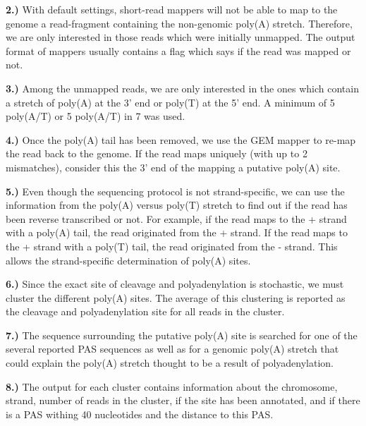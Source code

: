 \textbf{2.)} With default settings, short-read mappers will not be able to map
to the genome a read-fragment containing the non-genomic poly(A)
stretch. Therefore, we are only interested in those reads which were initially
unmapped. The output format of mappers usually contains a flag which says if
the read was mapped or not.

\textbf{3.)} Among the unmapped reads, we are only interested in the ones which
contain a stretch of poly(A) at the 3' end or poly(T) at the 5' end. A minimum
of 5 poly(A/T) or 5 poly(A/T) in 7 was used.

\textbf{4.)} Once the poly(A) tail has been removed, we use the GEM mapper to
re-map the read back to the genome. If the read maps uniquely (with up to 2
mismatches), consider this the 3' end of the mapping a putative poly(A) site.

\textbf{5.)} Even though the sequencing protocol is not strand-specific, we can
use the information from the poly(A) versus poly(T) stretch to find out if the
read has been reverse transcribed or not. For example, if the read maps to the
+ strand with a poly(A) tail, the read originated from the + strand. If the
read maps to the + strand with a poly(T) tail, the read originated from the -
strand. This allows the strand-specific determination of poly(A) sites.

\textbf{6.)} Since the exact site of cleavage and polyadenylation is stochastic,
we must cluster the different poly(A) sites. The average of this clustering is
reported as the cleavage and polyadenylation site for all reads in the cluster.

\textbf{7.)} The sequence surrounding the putative poly(A) site is searched for
one of the several reported PAS sequences as well as for a genomic poly(A)
stretch that could explain the poly(A) stretch thought to be a result of
polyadenylation.

\textbf{8.)} The output for each cluster contains information about the
chromosome, strand, number of reads in the cluster, if the site has been
annotated, and if there is a PAS withing 40 nucleotides and the distance to
this PAS.


